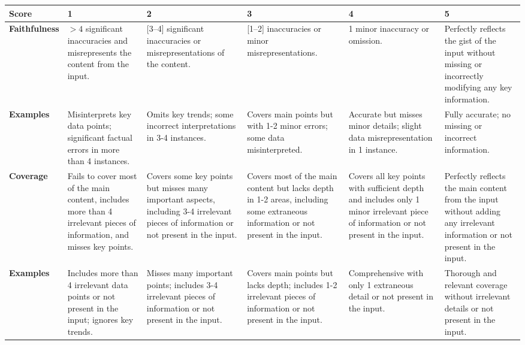 \documentclass{article}
\begin{document}

\scriptsize %

\begin{tabular}{|p{1.5cm}|p{2.5cm}|p{2.5cm}|p{2.5cm}|p{2.5cm}|p{3cm}|}
\hline
\textbf{Score} & \textbf{1} & \textbf{2} & \textbf{3} & \textbf{4} & \textbf{5} \\
\hline
\textbf{Faithfulness} &
$>4$ significant inaccuracies and misrepresents the content from the input.&
[3--4] significant inaccuracies or misrepresentations of the content. &
[1--2] inaccuracies or minor misrepresentations. &
1 minor inaccuracy or omission. &
Perfectly reflects the gist of the input without missing or incorrectly modifying any key information.\ \\
\hline
\textbf{Examples} &
Misinterprets key data points; significant factual errors in more than 4 instances. &
Omits key trends; some incorrect interpretations in 3-4 instances. &
Covers main points but with 1-2 minor errors; some data misinterpreted. &
Accurate but misses minor details; slight data misrepresentation in 1 instance. &
Fully accurate; no missing or incorrect information. \\
\hline
\textbf{Coverage} &
Fails to cover most of the main content, includes more than 4 irrelevant pieces of information, and misses key points. &
Covers some key points but misses many important aspects, including 3-4 irrelevant pieces of information or not present in the input. &
Covers most of the main content but lacks depth in 1-2 areas, including some extraneous information or not present in the input. &
Covers all key points with sufficient depth and includes only 1 minor irrelevant piece of information or not present in the input. &
Perfectly reflects the main content from the input without adding any irrelevant information or not present in the input.\\
\hline
\textbf{Examples} &
Includes more than 4 irrelevant data points or not present in the input; ignores key trends. &
Misses many important points; includes 3-4 irrelevant pieces of information or not present in the input. &
Covers main points but lacks depth; includes 1-2 irrelevant pieces of information or not present in the input. &
Comprehensive with only 1 extraneous detail or not present in the input. &
Thorough and relevant coverage without irrelevant details or not present in the input. \\
\hline
\end{tabular}

\end{document}
